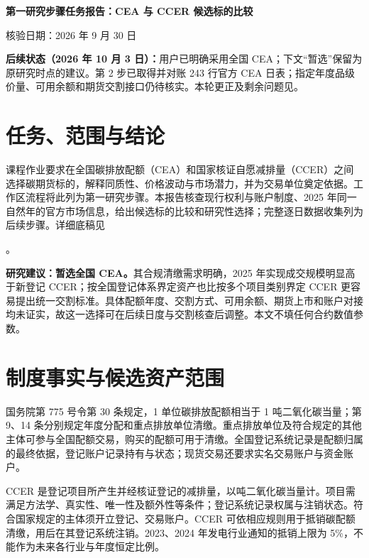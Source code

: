 \documentclass[UTF8,a4paper,11pt,oneside,fontset=fandol]{ctexart}
\begin{document}
\thispagestyle{plain}
\begin{center}
{\LARGE\bfseries 第一研究步骤任务报告：CEA 与 CCER 候选标的比较\par}
\vspace{0.4em}
{\small 核验日期：2026 年 9 月 30 日}\par
\end{center}

\noindent\textbf{后续状态（2026 年 10 月 3 日）：}用户已明确采用全国 CEA；下文“暂选”保留为原研究时点的建议。第 2 步已取得并对账 243 行官方 CEA 日表；指定年度品级价量、可用余额和期货交割接口仍待核实。本轮更正及剩余问题见。

\section{任务、范围与结论}
课程作业要求在全国碳排放配额（CEA）和国家核证自愿减排量（CCER）之间选择碳期货标的，解释同质性、价格波动与市场潜力，并为交易单位奠定依据。工作区流程将此列为第一研究步骤。本报告核查现行权利与账户制度、2025 年同一自然年的官方市场信息，给出候选标的比较和研究性选择；完整逐日数据收集列为后续步骤。详细底稿见\par\noindent{}。

\textbf{研究建议：暂选全国 CEA。}其合规清缴需求明确，2025 年实现成交规模明显高于新登记 CCER；按全国登记体系界定资产也比按多个项目类别界定 CCER 更容易提出统一交割标准。具体配额年度、交割方式、可用余额、期货上市和账户对接均未证实，故这一选择可在后续日度与交割核查后调整。本文不填任何合约数值参数。

\section{制度事实与候选资产范围}
国务院第 775 号令第 30 条规定，1 单位碳排放配额相当于 1 吨二氧化碳当量；第 9、14 条分别规定年度分配和重点排放单位清缴。重点排放单位及符合规定的其他主体可参与全国配额交易，购买的配额可用于清缴。全国登记系统记录是配额归属的最终依据，登记账户记录持有与状态；现货交易还要求实名交易账户与资金账户\cite{state2024,mee2021reg,mee2021trade}。

CCER 是登记项目所产生并经核证登记的减排量，以吨二氧化碳当量计。项目需满足方法学、真实性、唯一性及额外性等条件；登记系统记录权属与注销状态。符合国家规定的主体须开立登记、交易账户。CCER 可依相应规则用于抵销碳配额清缴，用后在其登记系统注销\cite{ccer2023}。2023、2024 年发电行业通知的抵销上限为 5\%，不能作为未来各行业与年度恒定比例\cite{mee2024allocation}。
\end{document}
